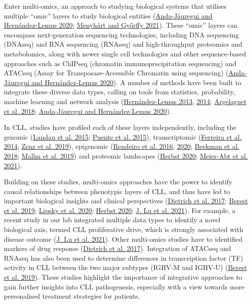 \documentclass[11pt, a4paper, twosided]{book}
\begin{document}
Enter multi-omics, an approach to studying biological systems that utilises multiple ``omic'' layers to study biological entities (\protect\hyperlink{ref-Anda2020}{Anda-Jáuregui and Hernández-Lemus 2020}; \protect\hyperlink{ref-Menyhart2021}{Menyhárt and Győrffy 2021}). These ``omic'' layers can encompass next-generation sequencing technologies, including DNA sequencing (DNAseq) and RNA sequencing (RNAseq) and high-throughput proteomics and metabolomics, along with newer single cell technologies and other sequence-based approaches such as ChIPseq (chromatin immunoprecipitation sequencing) and ATACseq (Assay for Transposase-Accessible Chromatin using sequencing) (\protect\hyperlink{ref-Anda2020}{Anda-Jáuregui and Hernández-Lemus 2020}). A number of methods have been built to integrate these diverse data types, calling on tools from statistics, probability, machine learning and network analysis (\protect\hyperlink{ref-Hernandez2013}{Hernández-Lemus 2013}, \protect\hyperlink{ref-Hernandez2014}{2014}; \protect\hyperlink{ref-Argelaguet2018}{Argelaguet et al. 2018}; \protect\hyperlink{ref-Anda2020}{Anda-Jáuregui and Hernández-Lemus 2020}).

In CLL, studies have profiled each of these layers independently, including the genomic (\protect\hyperlink{ref-Landau2015}{Landau et al. 2015}; \protect\hyperlink{ref-Puente2015}{Puente et al. 2015}), transcriptomic (\protect\hyperlink{ref-Ferreira2014}{Ferreira et al. 2014}; \protect\hyperlink{ref-Zenz2019}{Zenz et al. 2019}), epigenomic (\protect\hyperlink{ref-Rendeiro2016}{Rendeiro et al. 2016}, \protect\hyperlink{ref-Rendeiro2020}{2020}; \protect\hyperlink{ref-Beekman2018}{Beekman et al. 2018}; \protect\hyperlink{ref-Mallm2019}{Mallm et al. 2019}) and proteomic landscapes (\protect\hyperlink{ref-HerbstThesis}{Herbst 2020}; \protect\hyperlink{ref-MeierAbt2021}{Meier-Abt et al. 2021}).

Building on these studies, multi-omics approaches have the power to identify causal relationships between phenotypic layers of CLL, and thus have led to important biological insights and clinical perspectives (\protect\hyperlink{ref-JCIpaper}{Dietrich et al. 2017}; \protect\hyperlink{ref-Berest2019}{Berest et al. 2019}; \protect\hyperlink{ref-Lipsky2020}{Lipsky et al. 2020}; \protect\hyperlink{ref-HerbstThesis}{Herbst 2020}; \protect\hyperlink{ref-Lu2021}{J. Lu et al. 2021}). For example, a recent study in our lab integrated multiple data types to identify a novel biological axis, termed CLL proliferative drive, which is strongly associated with disease outcome (\protect\hyperlink{ref-Lu2021}{J. Lu et al. 2021}). Other multi-omics studies have to identified markers of drug response (\protect\hyperlink{ref-JCIpaper}{Dietrich et al. 2017}). Integration of ATACseq and RNAseq has also been used to determine differences in transcription factor (TF) activity in CLL between the two major subtypes (IGHV-M and IGHV-U) (\protect\hyperlink{ref-Berest2019}{Berest et al. 2019}). These studies highlight the importance of integrative approaches to gain further insights into CLL pathogenesis, especially with a view towards more personalised treatment strategies for patients.
\end{document}
